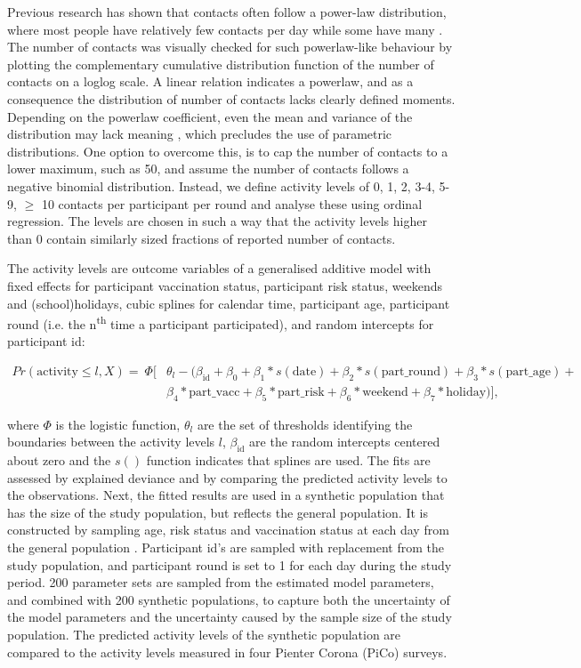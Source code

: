 \documentclass[fleqn,10pt]{wlscirep}
\begin{document}
Previous research has shown that contacts often follow a power-law distribution, where most people have relatively few contacts per day while some have many \cite{Liljeros_2001}. The number of contacts was visually checked for such powerlaw-like behaviour by plotting the complementary cumulative distribution function of the number of contacts on a loglog scale. A linear relation indicates a powerlaw, and as a consequence the distribution of number of contacts lacks clearly defined moments. Depending on the powerlaw coefficient, even the mean and variance of the distribution may lack meaning \cite{Tagore_2015}, which precludes the use of parametric distributions. One option to overcome this, is to cap the number of contacts to a lower maximum, such as 50, and assume the number of contacts follows a negative binomial distribution. Instead, we define activity levels of 0, 1, 2, 3-4, 5-9, $\geq$ 10 contacts per participant per round and analyse these using ordinal regression. The levels are chosen in such a way that the activity levels higher than 0 contain similarly sized fractions of reported number of contacts.

The activity levels are outcome variables of a generalised additive model with fixed effects for participant vaccination status, participant risk status, weekends and (school)holidays, cubic splines for calendar time, participant age, participant round (i.e. the n\textsuperscript{th} time a participant participated), and random intercepts for participant id: 

\begin{align*}
Pr(\mathrm{activity} \leq l, X) = \: \Phi[ & \theta_l - (\beta_\mathrm{id} + \beta_0 + \beta_1 * s(\mathrm{date}) + \beta_2 * s(\mathrm{part\_round}) + \beta_3 * s(\mathrm{part\_age}) + \\
& \beta_4 * \mathrm{part\_vacc} + \beta_5 * \mathrm{part\_risk} + \beta_6 * \mathrm{weekend} + \beta_7 * \mathrm{holiday})],
\end{align*}

where $\Phi$ is the logistic function, $\theta_l$ are the set of thresholds identifying the boundaries between the activity levels $l$, $\beta_\mathrm{id}$ are the random intercepts centered about zero and the $s()$ function indicates that splines are used. The fits are assessed by explained deviance and by comparing the predicted activity levels to the observations. Next, the fitted results are used in a synthetic population that has the size of the study population, but reflects the general population. It is constructed by sampling age, risk status and vaccination status at each day from the general population \cite{CBS_2021}. Participant id's are sampled with replacement from the study population, and participant round is set to 1 for each day during the study period. 200 parameter sets are sampled from the estimated model parameters, and combined with 200 synthetic populations, to capture both the uncertainty of the model parameters and the uncertainty caused by the sample size of the study population. The predicted activity levels of the synthetic population are compared to the activity levels measured in four Pienter Corona (PiCo) surveys.
\end{document}
